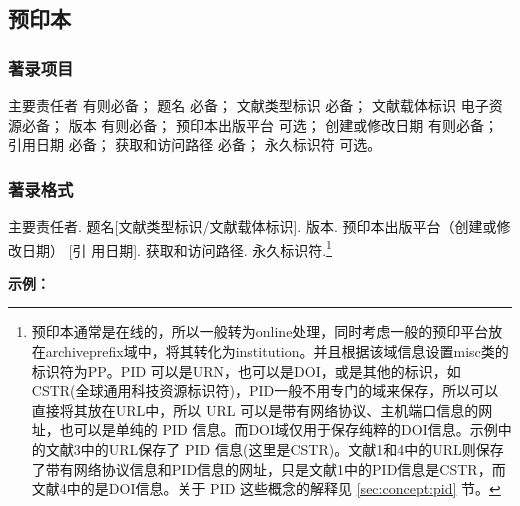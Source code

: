 \documentclass[twoside]{article}%
\begin{document}
\subsection{预印本}\label{sec:entrytype:preprint}


\subsubsection{著录项目}

主要责任者 有则必备；
题名 必备；
文献类型标识 必备；
文献载体标识 电子资源必备；
版本 有则必备；
预印本出版平台 可选；
创建或修改日期 有则必备；
引用日期 必备；
获取和访问路径 必备；
永久标识符 可选。

\subsubsection{著录格式}

主要责任者. 题名[文献类型标识/文献载体标识]. 版本. 预印本出版平台（创建或修改日期） [引
用日期]. 获取和访问路径. 永久标识符.\footnote{预印本通常是在线的，所以一般转为online处理，同时考虑一般的预印平台放在archiveprefix域中，将其转化为institution。并且根据该域信息设置misc类的标识符为PP。PID 可以是URN，也可以是DOI，或是其他的标识，如CSTR(全球通用科技资源标识符)，PID一般不用专门的域来保存，所以可以直接将其放在URL中，所以 URL 可以是带有网络协议、主机端口信息的网址，也可以是单纯的 PID 信息。而DOI域仅用于保存纯粹的DOI信息。示例中的文献3中的URL保存了 PID 信息(这里是CSTR)。文献1和4中的URL则保存了带有网络协议信息和PID信息的网址，只是文献1中的PID信息是CSTR，而文献4中的是DOI信息。关于 PID 这些概念的解释见 \ref{sec:concept:pid} 节。}



\begin{refsection}
\nocite{方向明2023元宇宙,肖玲2024数据,山东一医大2025,BLOSS2025trial,JENKINS2012light}


\textbf{示例：}

{\printbibliography[heading=none,env=indentegenv]}

\end{refsection}


\newpage
\appendix

\end{document}
